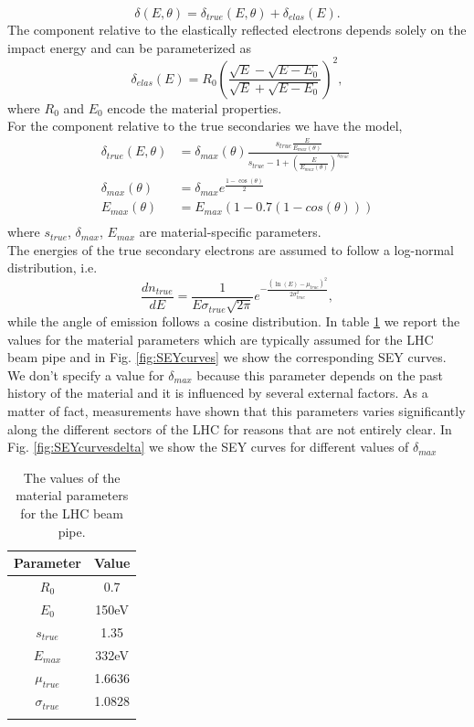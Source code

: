$$\delta(E, \theta) = \delta_{true}(E, \theta) + \delta_{elas}(E).$$
The component relative to the elastically reflected electrons depends solely on the impact energy and can be parameterized as
$$\delta_{elas}(E) = R_0 \left( \frac{ \sqrt{E} - \sqrt{E - E_0} }{ \sqrt{E} + \sqrt{E - E_0} } \right)^2 ,$$
where $R_0$ and $E_0$ encode the material properties.\\
For the component relative to the true secondaries we have the model,
\begin{equation*}
    \begin{split}
        \delta_{true}(E, \theta) &= \delta_{max}(\theta) \frac{ s_{true}\frac{E}{E_{max}(\theta)} }{s_{true} - 1 + \left( \frac{E}{E_{max}(\theta)}\right)^{s_{true}}}\\
        \delta_{max}(\theta) &= \delta_{max} e^{\frac{1-\cos(\theta)}{2}}\\
        E_{max}(\theta) &= E_{max} \left( 1 - 0.7(1 - cos(\theta)) \right)\\
    \end{split}
\end{equation*}
where $s_{true}$, $\delta_{max}$, $E_{max}$ are material-specific parameters.\\
The energies of the true secondary electrons are assumed to follow a log-normal distribution, i.e.
$$\frac{d n_{true}}{d E} = \frac{1}{E\sigma_{true} \sqrt{2 \pi}} e^{- \frac{(\ln(E)-\mu_{true})^2}{2 \sigma_{true}^2}},$$
while the angle of emission follows a cosine distribution.
In table \ref{tab:LHCVals} we report the values for the material parameters which are typically assumed for the LHC beam pipe and in Fig. \ref{fig:SEYcurves} we show the corresponding SEY curves. We don't specify a value for $\delta_{max}$ because this parameter depends on the past history of the material and it is influenced by several external factors. As a matter of fact, measurements have shown that this parameters varies significantly along the different sectors of the LHC for reasons that are not entirely clear. In Fig. \ref{fig:SEYcurvesdelta} we show the SEY curves for different values of $\delta_{max}$
\begin{table}
\begin{tabular}{c c}
    \hhline{==}
    Parameter & Value\\
    \hline
    $R_0$ &  0.7\\
    $E_0$ &  150eV\\
    $s_{true}$ & 1.35\\
    $E_{max}$ & 332eV \\
    $\mu_{true}$ & 1.6636\\
    $\sigma_{true}$ & 1.0828\\
    \hhline{==}
\end{tabular}
\caption{The values of the material parameters for the LHC beam pipe.}
\label{tab:LHCVals}
\end{table}

